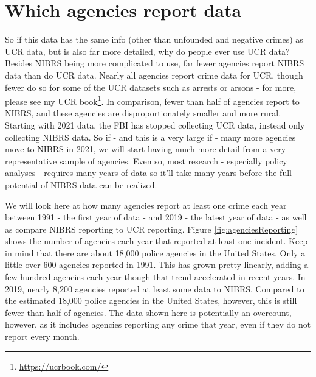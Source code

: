 \documentclass[
]{krantz}
\renewcommand{\href}[2]{#2\footnote{\url{#1}}}
\begin{document}
\section{Which agencies report
data}\label{which-agencies-report-data}

So if this data has the same info (other than unfounded and
negative crimes) as UCR data, but is also far more detailed,
why do people ever use UCR data? Besides NIBRS being more
complicated to use, far fewer agencies report NIBRS data
than do UCR data. Nearly all agencies report crime data for
UCR, though fewer do so for some of the UCR datasets such as
arrests or arsons - for more, please see my
\href{https://ucrbook.com/}{UCR book}. In comparison, fewer
than half of agencies report to NIBRS, and these agencies
are disproportionately smaller and more rural. Starting with
2021 data, the FBI has stopped collecting UCR data, instead
only collecting NIBRS data. So if - and this is a very large
if - many more agencies move to NIBRS in 2021, we will start
having much more detail from a very representative sample of
agencies. Even so, most research - especially policy
analyses - requires many years of data so it'll take many
years before the full potential of NIBRS data can be
realized.

We will look here at how many agencies report at least one
crime each year between 1991 - the first year of data - and
2019 - the latest year of data - as well as compare NIBRS
reporting to UCR reporting. Figure
\ref{fig:agenciesReporting} shows the number of agencies
each year that reported at least one incident. Keep in mind
that there are about 18,000 police agencies in the United
States. Only a little over 600 agencies reported in 1991.
This has grown pretty linearly, adding a few hundred
agencies each year though that trend accelerated in recent
years. In 2019, nearly 8,200 agencies reported at least some
data to NIBRS. Compared to the estimated 18,000 police
agencies in the United States, however, this is still fewer
than half of agencies. The data shown here is potentially an
overcount, however, as it includes agencies reporting any
crime that year, even if they do not report every month.
\end{document}
